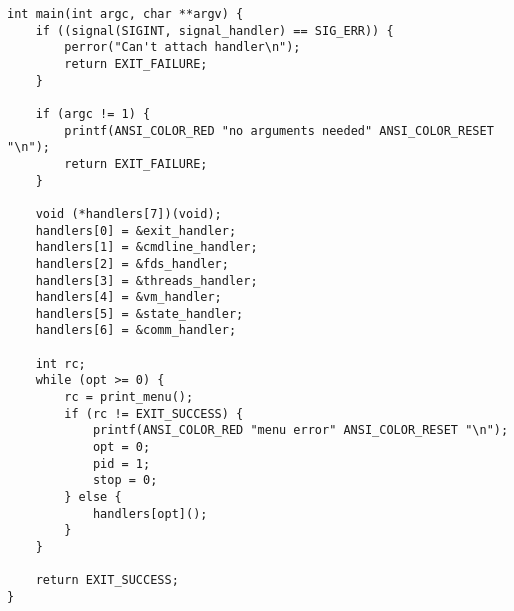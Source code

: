 \begin{appendices}
\begin{lstlisting}[label=client,caption=Код разработанного приложения уровня пользователя]
int main(int argc, char **argv) {
    if ((signal(SIGINT, signal_handler) == SIG_ERR)) {
        perror("Can't attach handler\n");
        return EXIT_FAILURE;
    }

    if (argc != 1) {
        printf(ANSI_COLOR_RED "no arguments needed" ANSI_COLOR_RESET "\n");
        return EXIT_FAILURE;
    }

    void (*handlers[7])(void);
    handlers[0] = &exit_handler;
    handlers[1] = &cmdline_handler;
    handlers[2] = &fds_handler;
    handlers[3] = &threads_handler;
    handlers[4] = &vm_handler;
    handlers[5] = &state_handler;
    handlers[6] = &comm_handler;

    int rc;
    while (opt >= 0) {
        rc = print_menu();
        if (rc != EXIT_SUCCESS) {
            printf(ANSI_COLOR_RED "menu error" ANSI_COLOR_RESET "\n");
            opt = 0;
            pid = 1;
            stop = 0;
        } else {
            handlers[opt]();
        }
    }

    return EXIT_SUCCESS;
}

	\end{lstlisting}
	
\end{appendices}